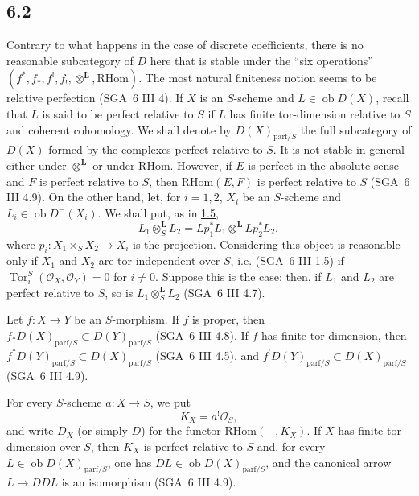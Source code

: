 \documentclass[11pt]{article}
\providecommand{\cO}{\mathcal{O}}
\DeclareMathOperator{\Tor}{Tor}
\providecommand{\RHom}{\mathrm{RHom}}
\providecommand{\RHom}{\mathrm{RHom}}
\providecommand{\RHom}{\mathrm R\mathcal{H}om}
\providecommand{\RHom}{\mathrm{RHom}}
\begin{document}
\subsection*{6.2}\label{sga5:III:subsection:6.2}
Contrary to what happens in the case of discrete coefficients, there is no reasonable subcategory of $D$ here that is stable under the ``six operations'' $(f^*,f_*,f^!,f_!,\otimes^{\mathbf L},\RHom)$. The most natural finiteness notion seems to be relative perfection (SGA~6 III 4). If $X$ is an $S$-scheme and $L\in\operatorname{ob}D(X)$, recall that $L$ is said to be perfect relative to $S$ if $L$ has finite tor-dimension relative to $S$ and coherent cohomology. We shall denote by $D(X)_{\mathrm{parf}/S}$ the full subcategory of $D(X)$ formed by the complexes perfect relative to $S$. It is not stable in general either under $\otimes^{\mathbf L}$ or under $\RHom$. However, if $E$ is perfect in the absolute sense and $F$ is perfect relative to $S$, then $\RHom(E,F)$ is perfect relative to $S$ (SGA~6 III 4.9). On the other hand, let, for $i=1,2$, $X_i$ be an $S$-scheme and $L_i\in\operatorname{ob}D^{-}(X_i)$. We shall put, as in \hyperref[sga5:III:subsection:1.5]{1.5},
\[
L_1\otimes_S^{\mathbf L}L_2=Lp_1^*L_1\otimes^{\mathbf L}Lp_2^*L_2,
\]
where $p_i:X_1\times_SX_2\to X_i$ is the projection. Considering this object is reasonable only if $X_1$ and $X_2$ are tor-independent over $S$, i.e. (SGA~6 III 1.5) if $\Tor_i^S(\cO_X,\cO_Y)=0$ for $i\ne0$. Suppose this is the case: then, if $L_1$ and $L_2$ are perfect relative to $S$, so is $L_1\otimes_S^{\mathbf L}L_2$ (SGA~6 III 4.7).

Let $f:X\to Y$ be an $S$-morphism. If $f$ is proper, then $f_*D(X)_{\mathrm{parf}/S}\subset D(Y)_{\mathrm{parf}/S}$ (SGA~6 III 4.8). If $f$ has finite tor-dimension, then $f^*D(Y)_{\mathrm{parf}/S}\subset D(X)_{\mathrm{parf}/S}$ (SGA~6 III 4.5), and $f^!D(Y)_{\mathrm{parf}/S}\subset D(X)_{\mathrm{parf}/S}$ (SGA~6 III 4.9).

For every $S$-scheme $a:X\to S$, we put
\begin{equation}
\tag{6.2.1}\label{sga5:III:equation:6.2.1}
K_X=a^!\cO_S,
\end{equation}
and write $D_X$ (or simply $D$) for the functor $\RHom(-,K_X)$. If $X$ has finite tor-dimension over $S$, then $K_X$ is perfect relative to $S$ and, for every $L\in\operatorname{ob}D(X)_{\mathrm{parf}/S}$, one has $DL\in\operatorname{ob}D(X)_{\mathrm{parf}/S}$, and the canonical arrow $L\to DDL$ is an isomorphism (SGA~6 III 4.9).
\end{document}
